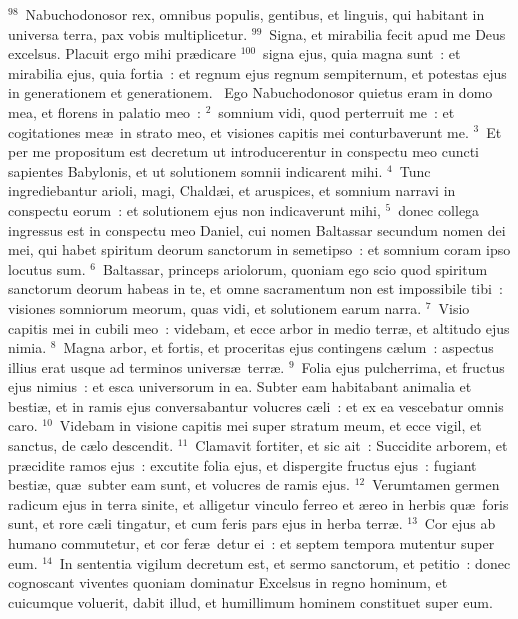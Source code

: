 ${}^{98}$~Nabuchodonosor rex, omnibus populis, gentibus, et linguis, qui habitant in universa terra, pax vobis multiplicetur.
${}^{99}$~Signa, et mirabilia fecit apud me Deus excelsus. Placuit ergo mihi pr\ae dicare
${}^{100}$~signa ejus, quia magna sunt~: et mirabilia ejus, quia fortia~: et regnum ejus regnum sempiternum, et potestas ejus in generationem et generationem.
~\lettrine[lines=10,image=true,loversize=0.05,lraise=-0.03]{E}{}go Nabuchodonosor quietus eram in domo mea, et florens in palatio meo~:
${}^{2}$~somnium vidi, quod perterruit me~: et cogitationes me\ae\ in strato meo, et visiones capitis mei conturbaverunt me.
${}^{3}$~Et per me propositum est decretum ut introducerentur in conspectu meo cuncti sapientes Babylonis, et ut solutionem somnii indicarent mihi.
${}^{4}$~Tunc ingrediebantur arioli, magi, Chald\ae i, et aruspices, et somnium narravi in conspectu eorum~: et solutionem ejus non indicaverunt mihi,
${}^{5}$~donec collega ingressus est in conspectu meo Daniel, cui nomen Baltassar secundum nomen dei mei, qui habet spiritum deorum sanctorum in semetipso~: et somnium coram ipso locutus sum.
${}^{6}$~Baltassar, princeps ariolorum, quoniam ego scio quod spiritum sanctorum deorum habeas in te, et omne sacramentum non est impossibile tibi~: visiones somniorum meorum, quas vidi, et solutionem earum narra.
${}^{7}$~Visio capitis mei in cubili meo~: videbam, et ecce arbor in medio terr\ae , et altitudo ejus nimia.
${}^{8}$~Magna arbor, et fortis, et proceritas ejus contingens c\ae lum~: aspectus illius erat usque ad terminos univers\ae\ terr\ae .
${}^{9}$~Folia ejus pulcherrima, et fructus ejus nimius~: et esca universorum in ea. Subter eam habitabant animalia et besti\ae , et in ramis ejus conversabantur volucres c\ae li~: et ex ea vescebatur omnis caro.
${}^{10}$~Videbam in visione capitis mei super stratum meum, et ecce vigil, et sanctus, de c\ae lo descendit.
${}^{11}$~Clamavit fortiter, et sic ait~: Succidite arborem, et pr\ae cidite ramos ejus~: excutite folia ejus, et dispergite fructus ejus~: fugiant besti\ae , qu\ae\ subter eam sunt, et volucres de ramis ejus.
${}^{12}$~Verumtamen germen radicum ejus in terra sinite, et alligetur vinculo ferreo et \ae reo in herbis qu\ae\ foris sunt, et rore c\ae li tingatur, et cum feris pars ejus in herba terr\ae .
${}^{13}$~Cor ejus ab humano commutetur, et cor fer\ae\ detur ei~: et septem tempora mutentur super eum.
${}^{14}$~In sententia vigilum decretum est, et sermo sanctorum, et petitio~: donec cognoscant viventes quoniam dominatur Excelsus in regno hominum, et cuicumque voluerit, dabit illud, et humillimum hominem constituet super eum.
